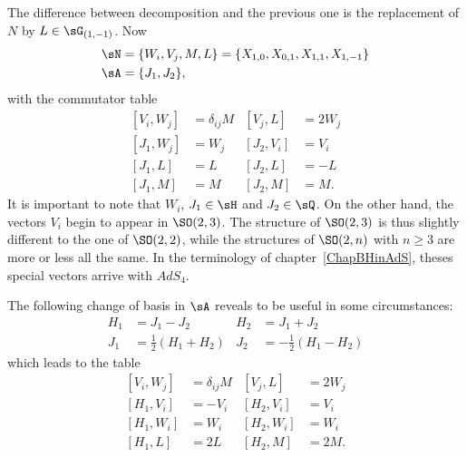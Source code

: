 The difference between decomposition and the previous one is the replacement of $N$ by $L\in\sG_{(1,-1)}$. Now\label{PgTablaIwa}
\begin{subequations}		\label{EqLeANEnDimAlg}
	\begin{align}
		\sN & =\{W_i,V_j,M,L\}=\{ X_{1,0},X_{0,1},X_{1,1},X_{1,-1} \} \\
		\sA & =\{ J_1, J_2\},
	\end{align}
\end{subequations}
with the commutator table
\begin{subequations}  \label{EqTableSOIwa}
	\begin{align}
		[V_i,W_j]  & =\delta_{ij}M & [V_j,L]    & =2W_j \\
		[ J_1,W_j] & =W_j          & [ J_2,V_i] & =V_i  \\
		[ J_1,L]   & =L            & [ J_2,L]   & =-L   \\
		[ J_1,M]   & =M            & [ J_2,M]   & =M.
	\end{align}
\end{subequations}
It is important to note that $W_{i}$, $J_{1}\in\sH$ and $J_{2}\in\sQ$. On the other hand, the vectors $V_i$ begin to appear in $\SO(2,3)$. The structure of $\SO(2,3)$ is thus slightly different to the one of $\SO(2,2)$, while the structures of $\SO(2,n)$ with $n\geq 3$ are more or less all the same. In the terminology of chapter~\ref{ChapBHinAdS}, theses special vectors arrive with $AdS_4$.

The following change of basis in $\sA$ reveals to be useful in some circumstances:
\begin{subequations}  \label{EqChmHJ}
	\begin{align}
		H_1 & =J_1-J_2                & H_2 & =J_1+J_2                 \\
		J_1 & =\frac{ 1 }{2}(H_1+H_2) & J_2 & =-\frac{ 1 }{2}(H_1-H_2)
	\end{align}
\end{subequations}
which leads to the table
\begin{subequations}		\label{TableSeconde}
	\begin{align}
		{}[V_i,W_j] & =\delta_{ij}M & [V_j,L]   & =2W_j \\
		[H_1,V_i]   & =-V_i         & [H_2,V_i] & =V_i  \\
		[H_1,W_i]   & =W_i          & [H_2,W_i] & =W_i  \\
		[H_1,L]     & =2L           & [H_2,M]   & =2M.
	\end{align}
\end{subequations}

